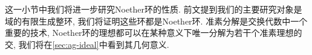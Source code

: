 这一小节中我们将进一步研究Noether环的性质. 前文提到我们的主要研究对象是域的有限生成整环, 我们将证明这些环都是Noether环. 准素分解是交换代数中一个重要的技术, Noether环的理想都可以在某种意义下唯一分解为若干个准素理想的交, 我们将在\ref{sec:ag-ideal}中看到其几何意义.





